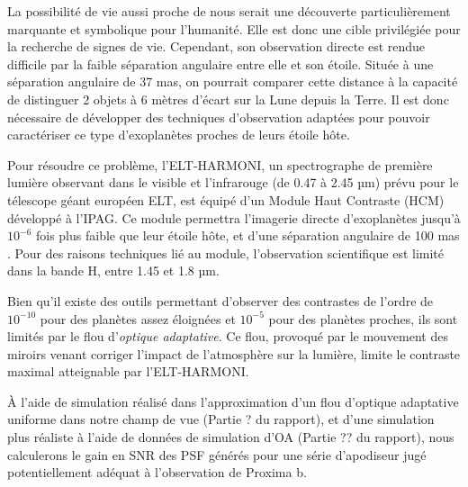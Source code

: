 
La possibilité de vie aussi proche de nous serait une découverte particulièrement marquante et symbolique pour l'humanité. Elle est donc une cible privilégiée pour la recherche de signes de vie. Cependant, son observation directe est rendue difficile par la faible séparation angulaire entre elle et son étoile. Située à une séparation angulaire de 37 mas, on pourrait comparer cette distance à la capacité de distinguer 2 objets à 6 mètres d'écart sur la Lune depuis la Terre. Il est donc nécessaire de développer des techniques d'observation adaptées pour pouvoir caractériser ce type d'exoplanètes proches de leurs étoile hôte.

Pour résoudre ce problème, l'ELT-HARMONI, un spectrographe de première lumière observant dans le visible et l'infrarouge (de 0.47 à 2.45 µm) prévu pour le télescope géant européen ELT, est équipé d'un Module Haut Contraste (HCM) développé à l'IPAG. Ce module permettra l'imagerie directe d'exoplanètes jusqu'à $10^{-6}$ fois plus faible que leur étoile hôte, et d'une séparation angulaire de 100 mas \cite{HCM} \cite{ZELDA}. Pour des raisons techniques lié au module, l'observation scientifique est limité dans la bande H, entre 1.45 et 1.8 µm.

Bien qu'il existe des outils permettant d'observer des contrastes de l'ordre de $10^{-10}$ pour des planètes assez éloignées et $10^{-5}$ pour des planètes proches, ils sont limités par le flou d'\textsl{optique adaptative}. Ce flou, provoqué par le mouvement des miroirs venant corriger l'impact de l'atmosphère sur la lumière, limite le contraste maximal atteignable par l'ELT-HARMONI.

À l’aide de simulation réalisé dans l’approximation d’un flou d’optique adaptative uniforme dans notre champ de vue (Partie ? du rapport), et d’une simulation plus réaliste à l'aide de données de simulation d’OA (Partie ?? du rapport), nous calculerons le gain en SNR des PSF générés pour une série d’apodiseur jugé potentiellement adéquat à l’observation de Proxima b.


